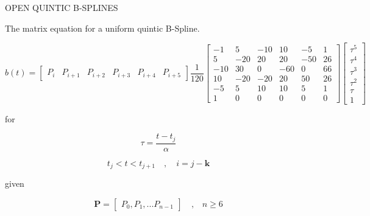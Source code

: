 \documentclass{article}
\begin{document}
\hspace{1cm}

OPEN QUINTIC B-SPLINES
\hfill \break

    The matrix equation for a uniform quintic B-Spline.
    
    \begin{equation}
        b(t) = \begin{bmatrix} P_i & P_{i+1} & P_{i+2} & P_{i+3} & P_{i+4} & P_{i+5} \end{bmatrix} \frac{1}{120} \begin{bmatrix} -1  &  5  & -10 &  10  & -5  & 1 \\
                                                     5  & -20 &  20 &  20  & -50 & 26\\
                                                    -10 &  30 &  0  & -60  &  0  & 66\\
                                                     10 & -20 & -20 &  20  &  50 & 26\\
                                                    -5  &  5  &  10 &  10  &  5  & 1\\
                                                     1  &  0  &  0  &  0   &  0  & 0\end{bmatrix} \begin{bmatrix} \tau^5 \\ \tau^4 \\ \tau^3 \\ \tau^2 \\ \tau \\ 1 \end{bmatrix}
    \end{equation}
    
    for
    
    \begin{equation}
        \tau = \frac{t-t_j}{\alpha}
    \end{equation}
    
    \begin{equation}
        t_j < t < t_{j+1} \quad , \quad i = j-\textbf{k}
    \end{equation}
    
    given
    
    \begin{equation}
    \textbf{P} = \begin{bmatrix} P_0, P_1, ... P_{n-1} \end{bmatrix} \quad \text{,} \quad n \geq 6
    \end{equation}
    
\end{document}
